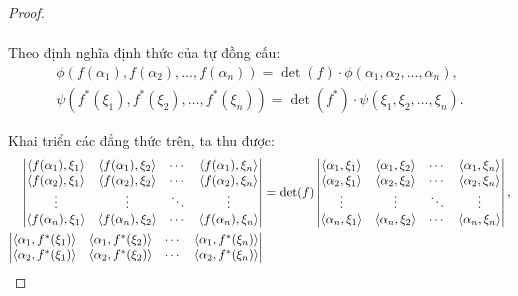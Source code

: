 \documentclass[class=nhvh-linear-algebra,crop=false]{standalone}
\begin{document}
\begin{proof}
\[\begin{split}
		\end{split}
	\]
	\par Theo định nghĩa định thức của tự đồng cấu:
	\[
		\begin{split}
			\phi(f(\alpha_{1}), f(\alpha_{2}), \ldots, f(\alpha_{n})) = \det(f)\cdot\phi(\alpha_{1}, \alpha_{2}, \ldots, \alpha_{n}), \\
			\psi(f^{*}(\xi_{1}), f^{*}(\xi_{2}), \ldots, f^{*}(\xi_{n})) = \det(f^{*})\cdot\psi(\xi_{1}, \xi_{2}, \ldots, \xi_{n}).
		\end{split}
	\]
	\par Khai triển các đẳng thức trên, ta thu được:
	\begingroup{}
	\allowdisplaybreaks{}
	\begin{align*}
		\begin{vmatrix}
			\left\langle{f(\alpha_{1}),\xi_{1}}\right\rangle & \left\langle{f(\alpha_{1}),\xi_{2}}\right\rangle & \cdots & \left\langle{f(\alpha_{1}),\xi_{n}}\right\rangle \\
			\left\langle{f(\alpha_{2}),\xi_{1}}\right\rangle & \left\langle{f(\alpha_{2}),\xi_{2}}\right\rangle & \cdots & \left\langle{f(\alpha_{2}),\xi_{n}}\right\rangle \\
			\vdots                          & \vdots                          & \ddots & \vdots                          \\
			\left\langle{f(\alpha_{n}),\xi_{1}}\right\rangle & \left\langle{f(\alpha_{n}),\xi_{2}}\right\rangle & \cdots & \left\langle{f(\alpha_{n}),\xi_{n}}\right\rangle \\
		\end{vmatrix}
		 & = \det(f)
		\begin{vmatrix}
			\left\langle{\alpha_{1},\xi_{1}}\right\rangle & \left\langle{\alpha_{1},\xi_{2}}\right\rangle & \cdots & \left\langle{\alpha_{1},\xi_{n}}\right\rangle \\
			\left\langle{\alpha_{2},\xi_{1}}\right\rangle & \left\langle{\alpha_{2},\xi_{2}}\right\rangle & \cdots & \left\langle{\alpha_{2},\xi_{n}}\right\rangle \\
			\vdots                       & \vdots                       & \ddots & \vdots                       \\
			\left\langle{\alpha_{n},\xi_{1}}\right\rangle & \left\langle{\alpha_{n},\xi_{2}}\right\rangle & \cdots & \left\langle{\alpha_{n},\xi_{n}}\right\rangle \\
		\end{vmatrix}, \\
		\begin{vmatrix}
			\left\langle{\alpha_{1},f^{*}(\xi_{1})}\right\rangle & \left\langle{\alpha_{1},f^{*}(\xi_{2})}\right\rangle & \cdots & \left\langle{\alpha_{1},f^{*}(\xi_{n})}\right\rangle \\
			\left\langle{\alpha_{2},f^{*}(\xi_{1})}\right\rangle & \left\langle{\alpha_{2},f^{*}(\xi_{2})}\right\rangle & \cdots & \left\langle{\alpha_{2},f^{*}(\xi_{n})}\right\rangle \\

\end{vmatrix}
\end{align*}
\end{proof}
\end{document}
